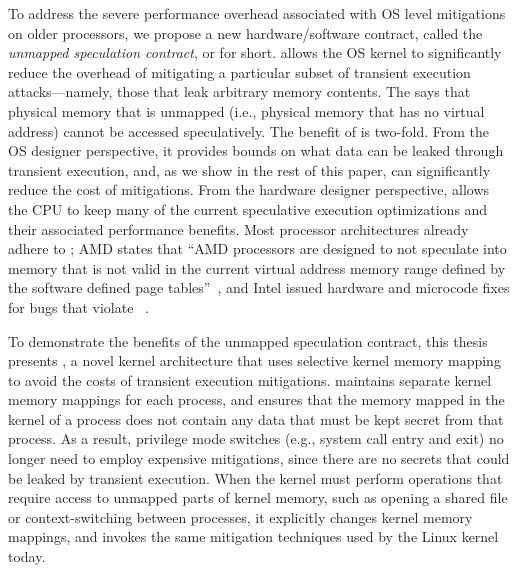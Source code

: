 
To address the severe performance overhead associated with OS level mitigations on older processors, we propose a new hardware/software contract, called the \emph{unmapped speculation contract}, or \contract{} for short.
\contract{} allows the OS kernel
to significantly reduce the overhead of mitigating a particular subset
of transient execution attacks---namely, those that leak arbitrary
memory contents.  The \contract{} says that physical memory that is
unmapped (i.e., physical memory that has no virtual address) cannot
be accessed speculatively.  The
benefit of \contract is two-fold.  From the OS designer perspective,
it provides bounds on what data can be leaked through transient execution,
and, as we show in the rest of this paper, can significantly reduce the
cost of mitigations.  From the hardware designer perspective, \contract
allows the CPU to keep many of the current speculative execution
optimizations and their associated performance benefits.  Most
processor architectures already adhere to \contract; AMD
states that ``AMD processors are designed to not speculate into memory
that is not valid in the current virtual address memory range defined
by the software defined page tables''~\cite[pg. 2]{amd:speculation},
and Intel issued hardware and microcode fixes for bugs that violate
\contract~\cite{intel:meltdown, intel:l1tf}.

To demonstrate the benefits of the unmapped speculation contract,
this thesis presents \sys{}, a novel kernel architecture that uses
selective kernel memory mapping to avoid the costs of transient execution
mitigations.  \sys{} maintains separate kernel memory mappings for each
process, and ensures that the memory mapped in the kernel of a process
does not contain any data that must be kept secret from that process.
As a result, privilege mode switches (e.g., system call entry and exit)
no longer need to employ expensive mitigations, since there are no
secrets that could be leaked by transient execution.  When the \sys{}
kernel must perform operations that require access to unmapped parts
of kernel memory, such as opening a shared file or context-switching
between processes, it explicitly changes kernel memory mappings, and
invokes the same mitigation techniques used by the Linux kernel today.

